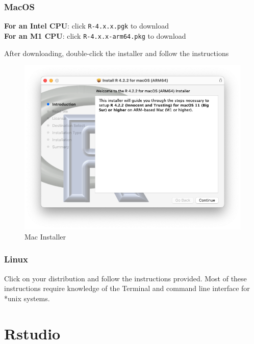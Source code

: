 \documentclass[
]{book}
\begin{document}
\hypertarget{macos}{%
\subsubsection*{MacOS}\label{macos}}

\textbf{For an Intel CPU}: click \texttt{R-4.x.x.pgk} to download\\
\textbf{For an M1 CPU}: click \texttt{R-4.x.x-arm64.pkg} to download

After downloading, double-click the installer and follow the instructions

\begin{figure}
\includegraphics[width=10.17in]{images/02_001_r_installer_mac_m1} \caption{\label{fig:2001}Mac Installer}\label{fig:2001}
\end{figure}

\hypertarget{linux}{%
\subsubsection*{Linux}\label{linux}}

Click on your distribution and follow the instructions provided. Most of these instructions require knowledge of the Terminal and command line interface for *unix systems.

\hypertarget{rstudio}{%
\section{Rstudio}\label{rstudio}}
\end{document}
